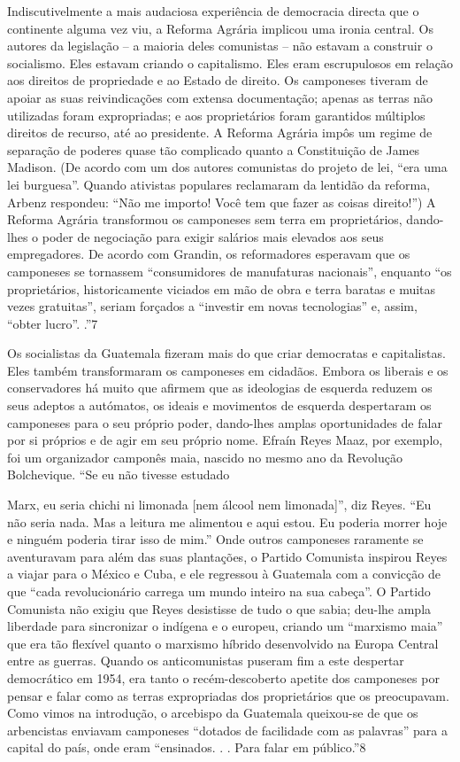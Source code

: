  \par 
Indiscutivelmente a mais audaciosa experiência de democracia directa que o continente alguma vez viu, a Reforma Agrária implicou uma ironia central. Os autores da legislação – a maioria deles comunistas – não estavam a construir o socialismo. Eles estavam criando o capitalismo. Eles eram escrupulosos em relação aos direitos de propriedade e ao Estado de direito. Os camponeses tiveram de apoiar as suas reivindicações com extensa documentação; apenas as terras não utilizadas foram expropriadas; e aos proprietários foram garantidos múltiplos direitos de recurso, até ao presidente. A Reforma Agrária impôs um regime de separação de poderes quase tão complicado quanto a Constituição de James Madison. (De acordo com um dos autores comunistas do projeto de lei, “era uma lei burguesa”. Quando ativistas populares reclamaram da lentidão da reforma, Arbenz respondeu: “Não me importo! Você tem que fazer as coisas direito!”) A Reforma Agrária transformou os camponeses sem terra em proprietários, dando-lhes o poder de negociação para exigir salários mais elevados aos seus empregadores. De acordo com Grandin, os reformadores esperavam que os camponeses se tornassem “consumidores de manufaturas nacionais”, enquanto “os proprietários, historicamente viciados em mão de obra e terra baratas e muitas vezes gratuitas”, seriam forçados a “investir em novas tecnologias” e, assim, “obter lucro”. .”{\color{blue}7}
 \par 
Os socialistas da Guatemala fizeram mais do que criar democratas e capitalistas. Eles também transformaram os camponeses em cidadãos. Embora os liberais e os conservadores há muito que afirmem que as ideologias de esquerda reduzem os seus adeptos a autómatos, os ideais e movimentos de esquerda despertaram os camponeses para o seu próprio poder, dando-lhes amplas oportunidades de falar por si próprios e de agir em seu próprio nome. Efraín Reyes Maaz, por exemplo, foi um organizador camponês maia, nascido no mesmo ano da Revolução Bolchevique. “Se eu não tivesse estudado
 \par 
Marx, eu seria chichi ni limonada [nem álcool nem limonada]”, diz Reyes. “Eu não seria nada. Mas a leitura me alimentou e aqui estou. Eu poderia morrer hoje e ninguém poderia tirar isso de mim.” Onde outros camponeses raramente se aventuravam para além das suas plantações, o Partido Comunista inspirou Reyes a viajar para o México e Cuba, e ele regressou à Guatemala com a convicção de que “cada revolucionário carrega um mundo inteiro na sua cabeça”. O Partido Comunista não exigiu que Reyes desistisse de tudo o que sabia; deu-lhe ampla liberdade para sincronizar o indígena e o europeu, criando um “marxismo maia” que era tão flexível quanto o marxismo híbrido desenvolvido na Europa Central entre as guerras. Quando os anticomunistas puseram fim a este despertar democrático em 1954, era tanto o recém-descoberto apetite dos camponeses por pensar e falar como as terras expropriadas dos proprietários que os preocupavam. Como vimos na introdução, o arcebispo da Guatemala queixou-se de que os arbencistas enviavam camponeses “dotados de facilidade com as palavras” para a capital do país, onde eram “ensinados. . . Para falar em público.”{\color{blue}8}
